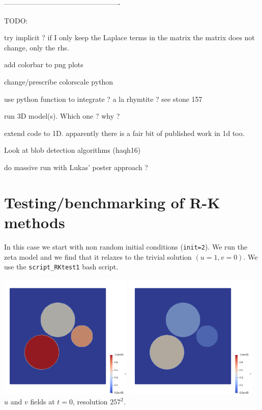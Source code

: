 -------------------------------------------------

TODO:

try implicit ? if I only keep the Laplace terms in the matrix the matrix does not change, only the rhs.

add colorbar to png plots

change/prescribe colorscale python

use python function to integrate ? a la rhymtite ? see stone 157

run 3D model(s). Which one ? why ?

extend code to 1D. apparently there is a fair bit of published work in 1d too.

Look at blob detection algorithms (haqh16) 

do massive run with Lukas' poster approach ?

\newpage
\section*{Testing/benchmarking of R-K methods}

In this case we start with non random initial conditions (\lstinline{init=2}).
We run the zeta model and we find that it relaxes to the trivial solution $(u=1,v=0)$.
We use the {\tt script\_RKtest1} bash script.

\begin{center}
\includegraphics[height=6cm]{python_codes/fieldstone_171/RKtest1/u0}
\includegraphics[height=6cm]{python_codes/fieldstone_171/RKtest1/v0}\\
{\captionfont $u$ and $v$ fields at $t=0$, resolution $257^2$.}
\end{center}

